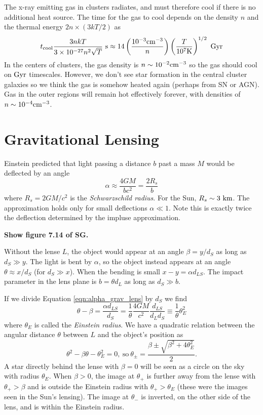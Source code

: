 \documentclass[]{article}
\begin{document}
The x-ray emitting gas in clusters radiates, and must
therefore cool if there is no additional 
heat source.  The time for the gas to cool 
depends on the density $n$ and the thermal
energy $2n \times (3kT/2)$ as
\begin{equation}
t_{\mathrm{cool}} \frac{3nkT}{3\times 10^{-27}n^2\sqrt{T}}~\mathrm{s}\approx 14\left(\frac{10^{-3}\mathrm{cm}^{-3}}{n}\right)\left(\frac{T}{10^{7}\mathrm{K}}\right)^{1/2}~\mathrm{Gyr}
\end{equation}
\noindent
In the centers of clusters, the gas density is $n\sim10^{-2}\mathrm{cm}^{-3}$ so
the gas should cool on $\mathrm{Gyr}$ timescales.  However, we don't see star
formation in the central cluster galaxies so we think the gas is somehow
heated again (perhaps from SN or AGN).  Gas in the outer regions
will remain hot effectively forever, with densities of $n\sim10^{-4}\mathrm{cm}^{-3}$.

\section{Gravitational Lensing}

Einstein predicted that light passing a distance $b$
past a mass $M$ would be deflected by an angle
\begin{equation}
\label{eqn:alpha_grav_lens}
\alpha \approx \frac{4GM}{bc^2} = \frac{2R_s}{b}
\end{equation}
\noindent
where $R_s = 2 GM/c^2$ is the {\it Schwarzschild radius}.
For the Sun, $R_s\sim3~\mathrm{km}$. The approximation
holds only for small deflections $\alpha\ll1$.
Note this is exactly twice the deflection determined by 
the impluse approximation.

{\bf Show figure 7.14 of SG.}

Without the lense $L$, the object would appear at an angle
$\beta = y/d_{S}$ as long as $d_{S} \gg y$.
The light is bent by $\alpha$, so the object instead appears
at an angle $\theta \approx x/d_S$ (for $d_S \gg x$).
When the bending is small $x-y = \alpha d_{LS}$.
The impact parameter in the lens plane is $b = \theta d_{L}$
as long as $d_S \gg b$.

If we divide Equation \ref{eqn:alpha_grav_lens} by $d_S$
we find
\begin{equation}
\theta - \beta = \frac{\alpha d_{LS}}{d_S} = \frac{1}{\theta} \frac{4 GM}{c^2} \frac{d_{LS}}{d_L d_S} \equiv \frac{1}{\theta} \theta_E^2
\end{equation}
\noindent
where $\theta_E$ is called the {\it Einstein radius}.
We have a quadratic relation between the angular distance $\theta$ between
$L$ and the object's position as
\begin{equation}
\theta^2 - \beta \theta - \theta_E^2 = 0,~\mathrm{so}~\theta_{\pm} = \frac{\beta \pm \sqrt{\beta^2 + 4 \theta_E^2}}{2}.
\end{equation}
\noindent
A star directly behind the lense with $\beta=0$ will be seen as a circle
on the sky with radius $\theta_E$.  When $\beta>0$, the image at $\theta_{+}$
is further away from the lense with $\theta_{+}>\beta$ and is outside
the Einstein radius with $\theta_{+}>\theta_E$ (these were the images
seen in the Sun's lensing).  The image at $\theta_{-}$ is inverted, on
the other side of the lens, and is within the Einstein radius.
\end{document}
